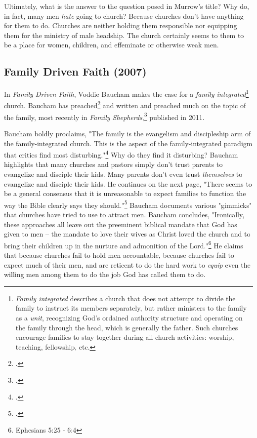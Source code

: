 Ultimately, what is the answer to the question posed in Murrow's title?  Why do, in fact, many men \textit{hate} going to church? Because churches don't have anything for them to do.  Churches are neither holding them responsible nor equipping them for the ministry of male headship.  The church certainly seems to them to be a place for women, children, and effeminate or otherwise weak men.  


\subsection{Family Driven Faith (2007)}
In \textit{Family Driven Faith}, Voddie Baucham makes the case for a \textit{family integrated}\footnote{\textit{Family integrated} describes a church that does not attempt to divide the family to instruct its members separately, but rather ministers to the family as a \textit{unit}, recognizing God's ordained authority structure and operating on the family through the head, which is generally the father.  Such churches encourage families to stay together during all church activities: worship, teaching, fellowship, etc.} church. Baucham has preached\footcite{bauchamcentrality} and written and preached much on the topic of the family, most recently in \textit{Family Shepherds},\footcite{bauchamshepherds} published in 2011.

Baucham boldly proclaims, "The family is the evangelism and discipleship arm of the family-integrated church.  This is the aspect of the family-integrated paradigm that critics find most disturbing."\footcite[p. 195]{bauchamdriven} Why do they find it disturbing?  Baucham highlights that many churches and pastors simply don't trust parents to evangelize and disciple their kids.  Many parents don't even trust \textit{themselves} to evangelize and disciple their kids.  He continues on the next page, "There seems to be a general consensus that it is unreasonable to expect families to function the way the Bible clearly says they should."\footcite[p. 196]{bauchamdriven}  Baucham documents various "gimmicks" that churches have tried to use to attract men.  Baucham concludes, "Ironically, these approaches all leave out the preeminent biblical mandate that God has given to men -- the mandate to love their wives as Christ loved the church and to bring their children up in the nurture and admonition of the Lord."\footnote{Ephesians 5:25 - 6:4} He claims that because churches fail to hold men accountable, because churches fail to expect much of their men, and are reticent to do the hard work to \textit{equip} even the willing men among them to do the job God has called them to do.  

